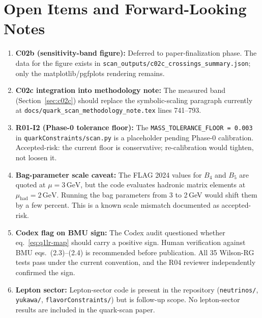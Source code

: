 \documentclass[11pt]{article}
\begin{document}
\section{Open Items and Forward-Looking Notes}
\label{sec:open}

\begin{enumerate}
  \item \textbf{C02b (sensitivity-band figure):} Deferred to
    paper-finalization phase.  The data for the figure exists in
    \texttt{scan\_outputs/c02c\_crossings\_summary.json}; only the
    matplotlib/pgfplots rendering remains.

  \item \textbf{C02c integration into methodology note:} The
    measured band (Section~\ref{sec:c02c}) should replace the
    symbolic-scaling paragraph currently at
    \texttt{docs/quark\_scan\_methodology\_note.tex} lines 741--793.

  \item \textbf{R01-I2 (Phase-0 tolerance floor):} The
    \texttt{MASS\_TOLERANCE\_FLOOR = 0.003} in
    \texttt{quarkConstraints/scan.py} is a placeholder pending
    Phase-0 calibration.  Accepted-risk: the current floor is
    conservative; re-calibration would tighten, not loosen it.

  \item \textbf{Bag-parameter scale caveat:} The FLAG 2024 values for
    $B_4$ and $B_5$ are quoted at $\mu = 3\,\mathrm{GeV}$, but the
    code evaluates hadronic matrix elements at
    $\mu_{\mathrm{had}} = 2\,\mathrm{GeV}$.  Running the bag
    parameters from 3 to 2\,GeV would shift them by a few percent.
    This is a known scale mismatch documented as accepted-risk.

  \item \textbf{Codex flag on BMU sign:} The Codex audit questioned
    whether eq.~\eqref{eq:q1lr-map} should carry a positive sign.
    Human verification against BMU eqs.~(2.3)--(2.4) is recommended
    before publication.  All 35 Wilson-RG tests pass under the current
    convention, and the R04 reviewer independently confirmed the sign.

  \item \textbf{Lepton sector:} Lepton-sector code is present in the
    repository (\texttt{neutrinos/}, \texttt{yukawa/},
    \texttt{flavorConstraints/}) but is follow-up scope.  No
    lepton-sector results are included in the quark-scan paper.
\end{enumerate}


\end{document}
